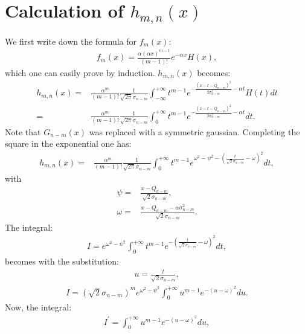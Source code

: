 \documentclass[preprint,12pt]{elsarticle}
\begin{document}
\section{Calculation of $h_{m,n}(x)$}
\label{app:Imn}
%

We first write down the formula for $f_m(x)$:
\begin{align}
f_m(x) =  \frac{\alpha (\alpha x )^{m-1}}{(m-1)!} e^{-\alpha x } H(x),
\end{align}
which one can easily prove by induction. 
$h_{m,n}(x)$ becomes:
\begin{align}
h_{m,n}(x) = & \frac{ \alpha^{m}}{(m-1)!} \frac{1}{\sqrt{2\pi}\sigma_{n-m}} \int_{-\infty}^{+\infty} t^{m-1} e^{ -\frac{ (x-t -Q_{n-m})^2}{2\sigma^2_{n-m}}-\alpha t} H(t) dt \nonumber \\
                  = & \frac{ \alpha^{m}}{(m-1)!} \frac{1}{\sqrt{2\pi}\sigma_{n-m}} \int_{0}^{+\infty} t^{m-1} e^{ -\frac{ (x-t -Q_{n-m})^2}{2\sigma^2_{n-m}}-\alpha t} dt.
\end{align}
Note that $G_{n-m}(x)$ was replaced with a symmetric gaussian. 
Completing the square in the exponential one has:
\begin{align}
h_{m,n}(x) = & \frac{ \alpha^{m}}{(m-1)!} \frac{1}{\sqrt{2\pi}\sigma_{n-m}} \int_{0}^{+\infty} t^{m-1} e^{  \omega^2  -\psi^2  -\left( \frac{t}{\sqrt{2}\sigma_{n-m}} - \omega \right)^2} dt,
\end{align}
with 
\begin{align}
\psi = & \frac{x-Q_{n-m}}{\sqrt{2}\sigma_{n-m}}, \\
\omega = & \frac{x-Q_{n-m} -\alpha\sigma^2_{n-m}}{\sqrt{2}\sigma_{n-m}}.
\end{align}  
The integral:
\begin{align}
I =  e^{  \omega^2  -\psi^2 }\int_{0}^{+\infty} t^{m-1} e^{  -\left( \frac{t}{\sqrt{2}\sigma_{n-m}} - \omega \right)^2} dt,
\end{align}
becomes with the substitution:
\begin{align}
u = \frac{t}{\sqrt{2}\sigma_{n-m}},
\end{align}
\begin{align}
I =  (\sqrt{2}\sigma_{n-m})^m e^{  \omega^2  -\psi^2 }\int_{0}^{+\infty} u^{m-1} e^{  -\left( u - \omega \right)^2} du.
\end{align}
Now, the integral:
\begin{align}
I^\prime = \int_{0}^{+\infty} u^{m-1} e^{  -\left( u - \omega \right)^2} du,
\end{align}
\end{document}
